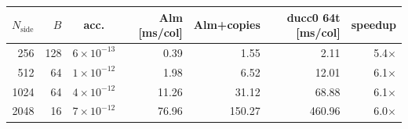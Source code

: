 \begin{tabular}{rrcrrrr}
\toprule
$N_\mathrm{side}$ & $B$ & acc. & Alm [ms/col] & Alm+copies & ducc0 64t [ms/col] & speedup \\
\midrule
256 & 128 & $6\times10^{-13}$ & 0.39 & 1.55 & 2.11 & 5.4$\times$ \\
512 & 64 & $1\times10^{-12}$ & 1.98 & 6.52 & 12.01 & 6.1$\times$ \\
1024 & 64 & $4\times10^{-12}$ & 11.26 & 31.12 & 68.88 & 6.1$\times$ \\
2048 & 16 & $7\times10^{-12}$ & 76.96 & 150.27 & 460.96 & 6.0$\times$ \\
\bottomrule
\end{tabular}
